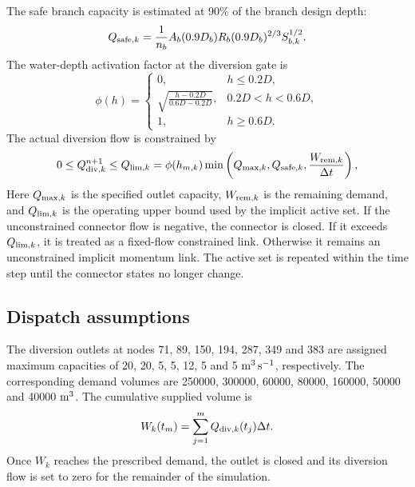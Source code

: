 The safe branch capacity is estimated at 90\% of the branch design depth:
\begin{equation}
    Q_{{\rm safe},k}
    =
    \frac{1}{n_b}
    A_b(0.9D_b)
    R_b(0.9D_b)^{2/3}
    S_{b,k}^{1/2}.
\end{equation}
The water-depth activation factor at the diversion gate is
\begin{equation}
    \phi(h) =
    \left\{
    \begin{array}{ll}
        0, & h \le 0.2D, \\
        \sqrt{\frac{h-0.2D}{0.6D-0.2D}}, & 0.2D < h < 0.6D, \\
        1, & h \ge 0.6D.
    \end{array}
    \right.
\end{equation}
The actual diversion flow is constrained by
\begin{equation}
    0
    \le
    Q_{{\rm div},k}^{n+1}
    \le
    Q_{{\rm lim},k}
    =
    \phi(h_{m,k})
    \min
    \left(
        Q_{{\rm max},k},
        Q_{{\rm safe},k},
        \frac{W_{{\rm rem},k}}{\Delta t}
    \right),
\end{equation}
Here \(Q_{{\rm max},k}\) is the specified outlet capacity, \(W_{{\rm rem},k}\)
is the remaining demand, and \(Q_{{\rm lim},k}\) is the operating upper bound
used by the implicit active set. If the unconstrained connector flow is
negative, the connector is closed. If it exceeds \(Q_{{\rm lim},k}\), it is
treated as a fixed-flow constrained link. Otherwise it remains an unconstrained
implicit momentum link. The active set is repeated within the time step until
the connector states no longer change.

\subsection{Dispatch assumptions}

The diversion outlets at nodes 71, 89, 150, 194, 287, 349 and 383 are assigned
maximum capacities of 20, 20, 5, 5, 12, 5 and 5 \({\rm m^3\,s^{-1}}\),
respectively. The corresponding demand volumes are 250000, 300000, 60000,
80000, 160000, 50000 and 40000 \({\rm m^3}\). The cumulative supplied volume is
\begin{equation}
    W_k(t_m) =
    \sum_{j=1}^{m}
    Q_{{\rm div},k}(t_j)\Delta t.
\end{equation}
Once \(W_k\) reaches the prescribed demand, the outlet is closed and its
diversion flow is set to zero for the remainder of the simulation.

